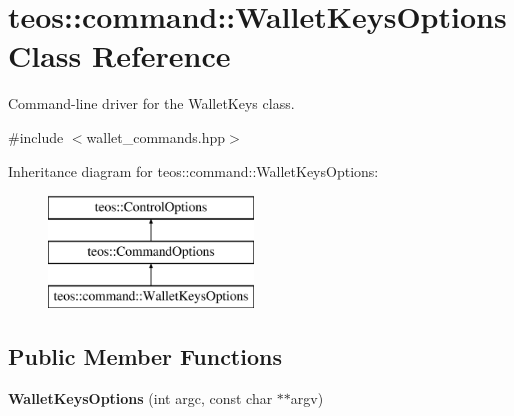\hypertarget{classteos_1_1command_1_1_wallet_keys_options}{}\section{teos\+:\+:command\+:\+:Wallet\+Keys\+Options Class Reference}
\label{classteos_1_1command_1_1_wallet_keys_options}


Command-\/line driver for the Wallet\+Keys class.  




{\ttfamily \#include $<$wallet\+\_\+commands.\+hpp$>$}

Inheritance diagram for teos\+:\+:command\+:\+:Wallet\+Keys\+Options\+:\begin{figure}[H]
\begin{center}
\leavevmode
\includegraphics[height=3.000000cm]{classteos_1_1command_1_1_wallet_keys_options}
\end{center}
\end{figure}
\subsection*{Public Member Functions}
\begin{DoxyCompactItemize}
\item 
\mbox{\label{classteos_1_1command_1_1_wallet_keys_options_ae553cec4b2558ec2f7489823627d21bc}} 
{\bfseries Wallet\+Keys\+Options} (int argc, const char $\ast$$\ast$argv)
\end{DoxyCompactItemize}
